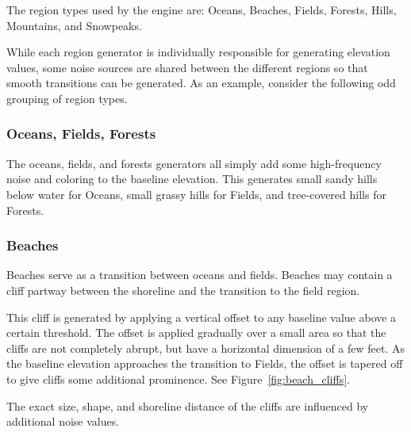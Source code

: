 The region types used by the engine are: Oceans, Beaches, Fields, Forests, Hills, Mountains, and Snowpeaks.

While each region generator is individually responsible for generating elevation values, some noise sources are shared between the different regions so that smooth transitions can be generated.
As an example, consider the following odd grouping of region types.

\subsubsection{Oceans, Fields, Forests}

The oceans, fields, and forests generators all simply add some high-frequency noise and coloring to the baseline elevation.
This generates small sandy hills below water for Oceans, small grassy hills for Fields, and tree-covered hills for Forests.

\subsubsection{Beaches}

Beaches serve as a transition between oceans and fields.
Beaches may contain a cliff partway between the shoreline and the transition to the field region.

This cliff is generated by applying a vertical offset to any baseline value above a certain threshold.
The offset is applied gradually over a small area so that the cliffs are not completely abrupt, but have a horizontal dimension of a few feet.
As the baseline elevation approaches the transition to Fields, the offset is tapered off to give cliffs some additional prominence.
See Figure~\ref{fig:beach_cliffs}.

The exact size, shape, and shoreline distance of the cliffs are influenced by additional noise values.

